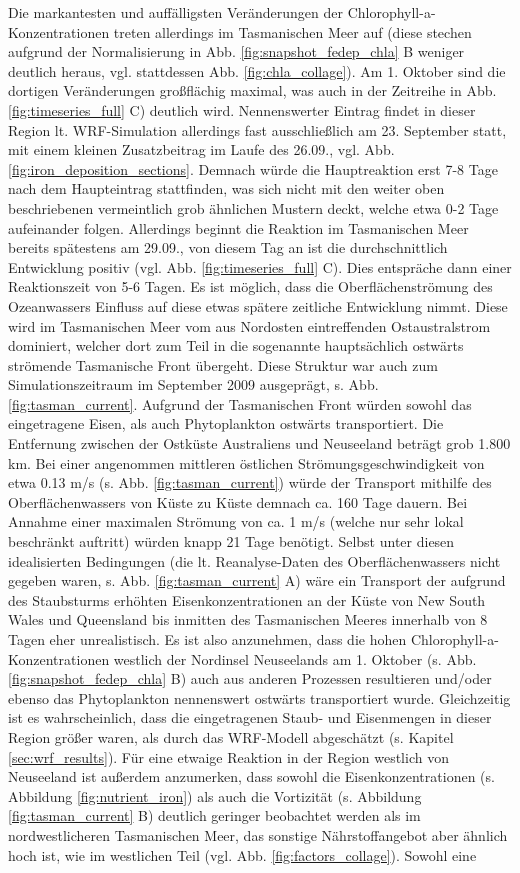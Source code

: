 \documentclass[12pt,a4paper,onecolumn]{scrartcl}
\begin{document}
Die markantesten und auffälligsten Veränderungen der Chlorophyll-a-Konzentrationen treten allerdings im Tasmanischen Meer auf (diese stechen aufgrund der Normalisierung in Abb. \ref{fig:snapshot_fedep_chla} B weniger deutlich heraus, vgl. stattdessen Abb. \ref{fig:chla_collage}). Am 1. Oktober sind die dortigen Veränderungen großflächig maximal, was auch in der Zeitreihe in Abb. \ref{fig:timeseries_full} C) deutlich wird. Nennenswerter Eintrag findet in dieser Region lt. WRF-Simulation allerdings fast ausschließlich am 23. September statt, mit einem kleinen Zusatzbeitrag im Laufe des 26.09., vgl. Abb. \ref{fig:iron_deposition_sections}. Demnach würde die Hauptreaktion erst 7-8 Tage nach dem Haupteintrag stattfinden, was sich nicht mit den weiter oben beschriebenen vermeintlich grob ähnlichen Mustern deckt, welche etwa 0-2 Tage aufeinander folgen. Allerdings beginnt die Reaktion im Tasmanischen Meer bereits spätestens am 29.09., von diesem Tag an ist die durchschnittlich Entwicklung positiv (vgl. Abb. \ref{fig:timeseries_full} C). Dies entspräche dann einer Reaktionszeit von 5-6 Tagen. Es ist möglich, dass die Oberflächenströmung des Ozeanwassers Einfluss auf diese etwas spätere zeitliche Entwicklung nimmt. Diese wird im Tasmanischen Meer vom aus Nordosten eintreffenden Ostaustralstrom dominiert, welcher dort zum Teil in die sogenannte hauptsächlich ostwärts strömende Tasmanische Front übergeht. Diese Struktur war auch zum Simulationszeitraum im September 2009 ausgeprägt, s. Abb. \ref{fig:tasman_current}. Aufgrund der Tasmanischen Front würden sowohl das eingetragene Eisen, als auch Phytoplankton ostwärts transportiert. Die Entfernung zwischen der Ostküste Australiens und Neuseeland beträgt grob 1.800 km. Bei einer angenommen mittleren östlichen Strömungsgeschwindigkeit von etwa 0.13 m/s (s. Abb. \ref{fig:tasman_current}) würde der Transport mithilfe des Oberflächenwassers von Küste zu Küste demnach ca. 160 Tage dauern. Bei Annahme einer maximalen Strömung von ca. 1 m/s (welche nur sehr lokal beschränkt auftritt) würden knapp 21 Tage benötigt. Selbst unter diesen idealisierten Bedingungen (die lt. Reanalyse-Daten des Oberflächenwassers nicht gegeben waren, s. Abb. \ref{fig:tasman_current} A) wäre ein Transport der aufgrund des Staubsturms erhöhten Eisenkonzentrationen an der Küste von New South Wales und Queensland bis inmitten des Tasmanischen Meeres innerhalb von 8 Tagen eher unrealistisch. Es ist also anzunehmen, dass die hohen Chlorophyll-a-Konzentrationen westlich der Nordinsel Neuseelands am 1. Oktober (s. Abb. \ref{fig:snapshot_fedep_chla} B) auch aus anderen Prozessen resultieren und/oder ebenso das Phytoplankton nennenswert ostwärts transportiert wurde. Gleichzeitig ist es wahrscheinlich, dass die eingetragenen Staub- und Eisenmengen in dieser Region größer waren, als durch das WRF-Modell abgeschätzt (s. Kapitel \ref{sec:wrf_results}). Für eine etwaige Reaktion in der Region westlich von Neuseeland ist außerdem anzumerken, dass sowohl die Eisenkonzentrationen (s. Abbildung \ref{fig:nutrient_iron}) als auch die Vortizität (s. Abbildung \ref{fig:tasman_current} B) deutlich geringer beobachtet werden als im nordwestlicheren Tasmanischen Meer, das sonstige Nährstoffangebot aber ähnlich hoch ist, wie im westlichen Teil (vgl. Abb. \ref{fig:factors_collage}). Sowohl eine 
\end{document}

